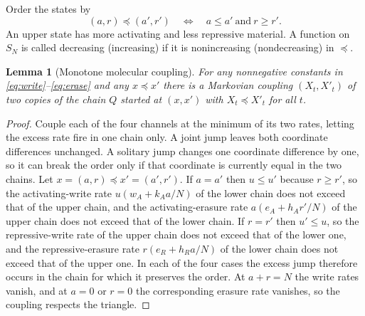 \documentclass[11pt]{article}
\newtheorem{lemma}[theorem]{Lemma}
\theoremstyle{remark}
\begin{document}
Order the states by
\[
 (a,r)\preceq(a',r')\quad\Longleftrightarrow\quad a\le a'\ \text{and}\ r\ge r' .
\]
An upper state has more activating and less repressive material. A function
on $S_N$ is called decreasing (increasing) if it is nonincreasing
(nondecreasing) in $\preceq$.

\begin{lemma}[Monotone molecular coupling]\label{lem:molecular}
For any nonnegative constants in \eqref{eq:write}--\eqref{eq:erase} and any
$x\preceq x'$ there is a Markovian coupling $(X_t,X'_t)$ of two copies of the
chain $Q$ started at $(x,x')$ with $X_t\preceq X'_t$ for all $t$.
\end{lemma}
\begin{proof}
Couple each of the four channels at the minimum of its two rates, letting the
excess rate fire in one chain only. A joint jump leaves both coordinate
differences unchanged. A solitary jump changes one coordinate difference by
one, so it can break the order only if that coordinate is currently equal in
the two chains. Let $x=(a,r)\preceq x'=(a',r')$. If $a=a'$ then $u\le u'$
because $r\ge r'$, so the activating-write rate $u(w_A+k_Aa/N)$ of the lower
chain does not exceed that of the upper chain, and the activating-erasure
rate $a(e_A+h_Ar'/N)$ of the upper chain does not exceed that of the lower
chain. If $r=r'$ then $u'\le u$, so the repressive-write rate of the upper
chain does not exceed that of the lower one, and the repressive-erasure rate
$r(e_R+h_Ra/N)$ of the lower chain does not exceed that of the upper one.
In each of the four cases the excess jump therefore occurs in the chain for
which it preserves the order. At $a+r=N$ the write rates vanish, and at $a=0$
or $r=0$ the corresponding erasure rate vanishes, so the coupling respects the
triangle.
\end{proof}
\end{document}
